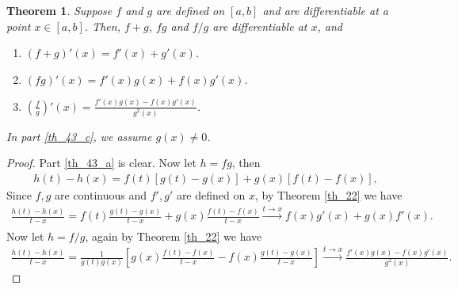 \documentclass[11pt]{book}
\newtheorem{theorem}{Theorem}[chapter]
\theoremstyle{definition}
\numberwithin{equation}{chapter}
\begin{document}
\medskip

\begin{theorem}\label{th_43}
Suppose $f$ and $g$ are defined on $[a,b]$ and are differentiable at a point $x \in [a,b]$. Then, $f + g$, $fg$ and $f/g$ are differentiable at $x$, and
\begin{enumerate}[label=(\alph*)]
    \item $(f + g)'(x) = f'(x) + g'(x)$. \label{th_43_a}
    
    \item $(fg)'(x) = f'(x)g(x) + f(x)g'(x)$. \label{th_43_b}
    
    \item $\displaystyle \left(\frac{f}{g}\right)'(x) = \frac{f'(x)g(x) - f(x)g'(x)}{g^2(x)}$. \label{th_43_c}
\end{enumerate}
In part \ref{th_43_c}, we assume $g(x) \neq 0$.
\end{theorem}
\begin{proof}
Part \ref{th_43_a} is clear. Now let $h = fg$, then
\begin{align*}
    h(t) - h(x) = f(t)[g(t) - g(x)] + g(x)[f(t) - f(x)],
\end{align*}
Since $f, g$ are continuous and $f',g'$ are defined on $x$, by Theorem \ref{th_22} we have
\begin{align*}
    \frac{h(t) - h(x)}{t - x} = f(t) \frac{g(t) - g(x)}{t - x} + g(x) \frac{f(t) - f(x)}{t - x} \xrightarrow[]{t \to x} f(x)g'(x) + g(x) f'(x).
\end{align*}
Now let $h = f/g$, again by Theorem \ref{th_22} we have
\begin{align*}
    \frac{h(t) - h(x)}{t - x} = \frac{1}{g(t)g(x)} \left[g(x) \frac{f(t) - f(x)}{t - x} - f(x) \frac{g(t) - g(x)}{t - x} \right] \xrightarrow[]{t \to x} \frac{f'(x)g(x) - f(x)g'(x)}{g^2(x)}.
\end{align*}
\end{proof}

\medskip
\end{document}
